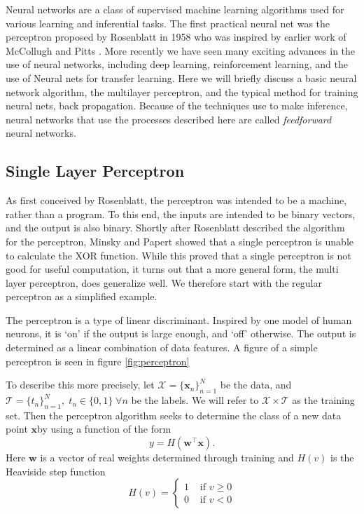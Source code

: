 Neural networks are a class of supervised machine learning algorithms used for various learning and inferential tasks.  The first practical neural net was the perceptron proposed by Rosenblatt in 1958 \cite{Rosenblatt58theperceptron} who was inspired by earlier work of McCollugh and Pitts \cite{McCulloch-Pitts}.  More recently we have seen many exciting advances in the use of neural networks, including deep learning, reinforcement learning, and the use of Neural nets for transfer learning.
Here we will briefly discuss a basic neural network algorithm, the multilayer perceptron, and the typical method for training neural nets, back propagation.  Because of the techniques use to make inference, neural networks that use the processes described here are called \textit{feedforward} neural networks.
\subsection{Single Layer Perceptron}
As first conceived by Rosenblatt, the perceptron was intended to be a machine, rather than a program. To this end, the inputs are intended to be binary vectors, and the output is also binary.  Shortly after Rosenblatt described the algorithm for the perceptron, Minsky and Papert \cite{Minsky90Perceptron} showed that a single perceptron is unable to calculate the XOR function.  While this proved that a single perceptron is not good for useful computation, it turns out that a more general form, the multi layer perceptron, does generalize well.  We therefore start with the regular perceptron as a simplified example.

The perceptron is a type of linear discriminant.  Inspired by one model of human neurons, it is `on' if the output is large enough, and `off' otherwise.  The output is determined as a linear combination of data features.  A figure of a simple perceptron is seen in figure \ref{fig:perceptron}



To describe this more precisely, let $\mathcal{X}=\{\bm x_n\}_{n=1}^{N}$ be the data, and \( \mathcal{T} =\{t_n\}_{n=1}^{N},\; t_n\in \{0,1\} \;\forall n \) be the labels. We will refer to \( \mathcal{X}\times \mathcal{T} \) as the training set. Then the perceptron algorithm seeks to determine the class of a new data point \( \bm x \)by using a function of the form
\begin{equation}\label{perceptron}
y = H(\bm w^{\intercal} \bm x).
\end{equation}
Here \( \bm w \) is a vector of real weights determined through training and  \( H(v) \) is the Heaviside step function
\[ H(v) =\begin{cases}
 			1 &\text{ if }v\geq 0\\
 			0 &\text{ if }v<0
		 \end{cases} 
\]

